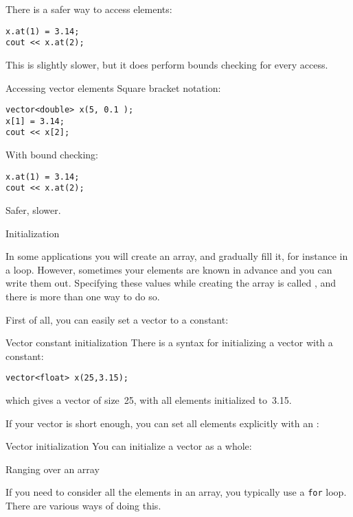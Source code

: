 There is a safer way to access elements:
\begin{lstlisting}
x.at(1) = 3.14;
cout << x.at(2);  
\end{lstlisting}
This is slightly slower, but it does perform bounds checking for every access.

\begin{slide}{Accessing vector elements}
  \label{sl:vectorsub}
  Square bracket notation:
\begin{lstlisting}
vector<double> x(5, 0.1 );
x[1] = 3.14;
cout << x[2];
\end{lstlisting}
With bound checking:
\begin{lstlisting}
x.at(1) = 3.14;
cout << x.at(2);
\end{lstlisting}
Safer, slower.
\end{slide}

 {Initialization}

In some applications you will create an array, and gradually fill it,
for instance in a loop. However, sometimes your elements are known in
advance and you can write them out. Specifying these values while
creating the array is called , and
there is more than one way to do so.

First of all, you can easily set a vector to a constant:

\begin{block}{Vector constant initialization}
  \label{sl:vector-initconst}
  There is a syntax for initializing a vector with a constant:
\begin{lstlisting}
vector<float> x(25,3.15);
\end{lstlisting}
which gives a vector of size~25, with all elements initialized to~3.15.
\end{block}

If your vector is short enough, you can set all elements explicitly with an
:

\begin{block}{Vector initialization}
  \label{sl:vector-init}
  You can initialize a vector as a whole:
\end{block}

 {Ranging over an array}
\label{sec:arrayrange}

If you need to consider all the elements in an array, you typically
use a \lstinline{for} loop. There are various ways of doing this.

